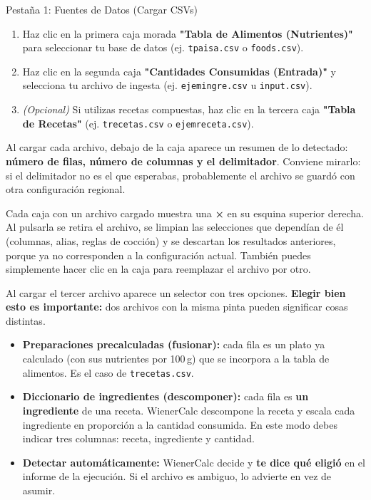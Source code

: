 \documentclass[11pt,a4paper]{article}
\begin{document}
\vspace{0.4cm}

\begin{stepcard}{Pestaña 1: Fuentes de Datos (Cargar CSVs)}
\begin{enumerate}[leftmargin=*]
    \item Haz clic en la primera caja morada \textbf{"Tabla de Alimentos (Nutrientes)"} para seleccionar tu base de datos (ej. \texttt{tpaisa.csv} o \texttt{foods.csv}).
    \item Haz clic en la segunda caja \textbf{"Cantidades Consumidas (Entrada)"} y selecciona tu archivo de ingesta (ej. \texttt{ejemingre.csv} u \texttt{input.csv}).
    \item \textit{(Opcional)} Si utilizas recetas compuestas, haz clic en la tercera caja \textbf{"Tabla de Recetas"} (ej. \texttt{trecetas.csv} o \texttt{ejemreceta.csv}).
\end{enumerate}

Al cargar cada archivo, debajo de la caja aparece un resumen de lo detectado: \textbf{número de filas, número de columnas y el delimitador}. Conviene mirarlo: si el delimitador no es el que esperabas, probablemente el archivo se guardó con otra configuración regional.

\begin{tipbox}
Cada caja con un archivo cargado muestra una \textbf{×} en su esquina superior derecha. Al pulsarla se retira el archivo, se limpian las selecciones que dependían de él (columnas, alias, reglas de cocción) y se descartan los resultados anteriores, porque ya no corresponden a la configuración actual. También puedes simplemente hacer clic en la caja para reemplazar el archivo por otro.
\end{tipbox}

\begin{glassbox}
Al cargar el tercer archivo aparece un selector con tres opciones. \textbf{Elegir bien esto es importante:} dos archivos con la misma pinta pueden significar cosas distintas.
\begin{itemize}[label=\textcolor{aeroemerald}{$\rightarrow$}]
    \item \textbf{Preparaciones precalculadas (fusionar):} cada fila es un plato ya calculado (con sus nutrientes por 100\,g) que se incorpora a la tabla de alimentos. Es el caso de \texttt{trecetas.csv}.
    \item \textbf{Diccionario de ingredientes (descomponer):} cada fila es \textbf{un ingrediente} de una receta. WienerCalc descompone la receta y escala cada ingrediente en proporción a la cantidad consumida. En este modo debes indicar tres columnas: receta, ingrediente y cantidad.
    \item \textbf{Detectar automáticamente:} WienerCalc decide y \textbf{te dice qué eligió} en el informe de la ejecución. Si el archivo es ambiguo, lo advierte en vez de asumir.
\end{itemize}
\end{glassbox}


\end{stepcard}
\end{document}

